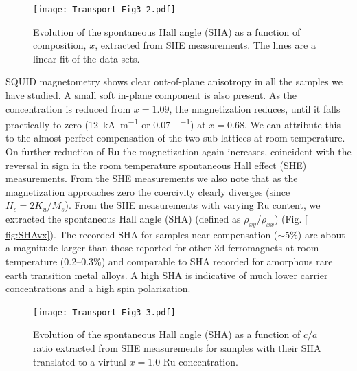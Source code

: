 \documentclass[reprint,aip,apl,floatfix,linenumbers,superscriptaddress]{revtex4-1}
\begin{document}
\begin{figure}
\texttt{[image: Transport-Fig3-2.pdf]}
\caption{Evolution of the spontaneous Hall angle (SHA) as a function of  composition, $x$, extracted from SHE measurements. The lines are a 
linear fit of the data sets.}
\label{fig:SHAvx}
\end{figure}

SQUID magnetometry shows clear out-of-plane anisotropy in all the samples we 
have studied.  A small soft in-plane component is also 
present. As the  concentration is reduced from $x=\num{1.09}$, 
the magnetization reduces, until it falls practically to zero (\SI{12}{
\kilo\ampere\per\metre} or \SI{0.07}{\BohrMagneton\per\formulaunit}) at $x=
\num{0.68}$. We can attribute this to the almost perfect compensation of the 
two  
sub-lattices at room temperature. On further reduction of Ru the 
magnetization again increases, coincident with the reversal in sign in the 
room temperature spontaneous Hall effect (SHE) measurements. From the SHE 
measurements we also note that as the magnetization approaches zero the 
coercivity clearly diverges (since $H_c=2K_u/M_s$).
From the SHE measurements with varying Ru content, we extracted the 
spontaneous Hall angle (SHA) (defined as $\rho_{xy}$/$\rho_{xx}$) (Fig. \ref{
fig:SHAvx}).  
The recorded SHA for samples near compensation ($\sim \num{5}\%$) are about a 
magnitude larger than those reported for other 3d ferromagnets at room 
temperature (\numrange{0.2}{0.3}\%)\cite{dorleijn1976} and comparable to SHA 
recorded for amorphous rare earth transition metal alloys\cite{Kim2001}. A 
high SHA is indicative of much lower carrier concentrations and a high spin 
polarization.

\begin{figure}
\texttt{[image: Transport-Fig3-3.pdf]}
\caption{Evolution of the spontaneous Hall angle (SHA) as a function of $c/a$ 
ratio extracted from SHE measurements for samples with their SHA translated 
to a virtual $x=1.0$ Ru concentration.}
\label{fig:SHAvca}
\end{figure}
\end{document}
